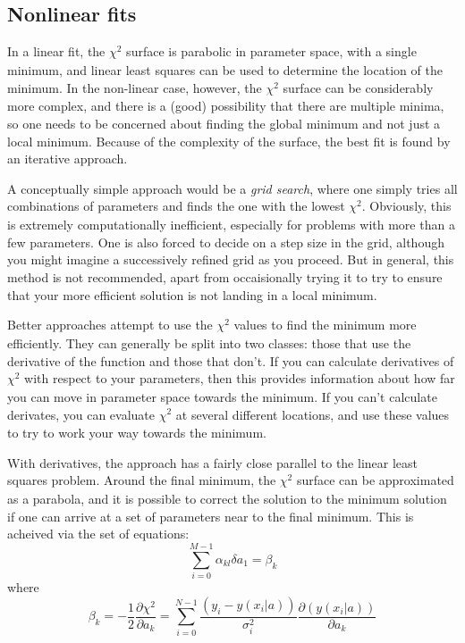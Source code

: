 \documentclass[12pt]{article}
\begin{document}
\subsection{Nonlinear fits}

In a linear fit, the $ \chi^{2}_{}$ surface is parabolic in parameter
space, with a single minimum, and linear least squares can be used to
determine the location of the minimum. In the non-linear case, however, the
$ \chi^{2}_{}$ surface can be considerably more complex, and there is a
(good) possibility that there are multiple minima, so one needs to be
concerned about finding the global minimum and not just a local minimum.
Because of the complexity of the surface, the best fit is found by an
iterative approach.

A conceptually simple approach would be a \emph{grid search}, where one simply
tries all combinations of parameters and finds the one with the lowest $
\chi^{2}_{}$. Obviously, this is extremely computationally inefficient,
especially for problems with more than a few parameters. One is also forced
to decide on a step size in the grid, although you might imagine a
successively refined grid as you proceed. But in general, this method is
not recommended, apart from occaisionally trying it to try to ensure that
your more efficient solution is not landing in a local minimum.

Better approaches attempt to use the $ \chi^{2}_{}$ values to find the
minimum more efficiently. They can generally be split into two classes:
those that use the derivative of the function and those that don't. If you
can calculate derivatives of $ \chi^{2}_{}$ with respect to your
parameters, then this provides information about how far you can move in
parameter space towards the minimum. If you can't calculate derivates, you
can evaluate $ \chi^{2}_{}$ at several different locations, and use these
values to try to work your way towards the minimum.

With derivatives, the approach has a fairly close parallel to the linear
least squares problem. Around the final minimum, the $ \chi^{2}_{}$ surface
can be approximated as a parabola, and it is possible to correct the
solution to the minimum solution if one can arrive at a set of parameters
near to the final minimum. This is acheived via the set of equations:
$$ \sum_{i=0}^{M-1}\alpha_{kl}\delta a_{1} = \beta_{k} $$
where
$$ \beta_{k} = -\frac{1}{2}\frac{\partial\chi^{2}}{\partial a_{k}} =
\sum_{i=0}^{N-1}\frac{(y_{i}-y(x_{i}|a))}{\sigma_{i}^{2}}
\frac{\partial(y(x_{i}|a))}{\partial a_{k}} $$
\end{document}

